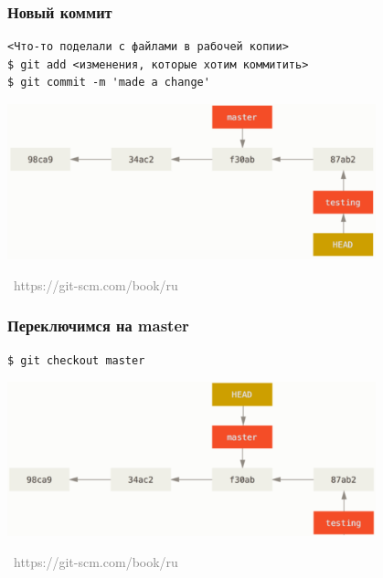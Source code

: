 \documentclass[xetex,mathserif,serif]{beamer}
\newcommand{\attribution}[1] {
    \vspace{-5mm}\begin{flushright}\begin{scriptsize}\textcolor{gray}{\textcopyright\, #1}\end{scriptsize}\end{flushright}
}
\begin{document}
    \begin{frame}[fragile]
        \frametitle{Новый коммит}
        \begin{verbatim}
<Что-то поделали с файлами в рабочей копии>
$ git add <изменения, которые хотим коммитить>
$ git commit -m 'made a change'
        \end{verbatim}
        \begin{center}
            \includegraphics[width=0.8\textwidth]{newCommit.png}
            \attribution{https://git-scm.com/book/ru}
        \end{center}
    \end{frame}

    \begin{frame}[fragile]
        \frametitle{Переключимся на master}
        \begin{verbatim}
$ git checkout master
        \end{verbatim}
        \begin{center}
            \includegraphics[width=0.8\textwidth]{checkoutToMaster.png}
            \attribution{https://git-scm.com/book/ru}
        \end{center}
    \end{frame}
\end{document}
